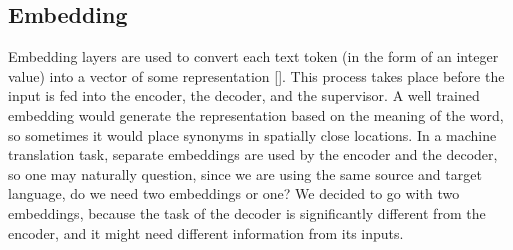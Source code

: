 \documentclass[letterpaper]{article} %
\begin{document}
\subsection{Embedding}
Embedding layers are used to convert each text token (in the form of an integer value) into a vector of some representation []. This process takes place before the input is fed into the encoder, the decoder, and the supervisor. A well trained embedding would generate the representation based on the meaning of the word, so sometimes it would place synonyms in spatially close locations. In a machine translation task, separate embeddings are used by the encoder and the decoder, so one may naturally question, since we are using the same source and target language, do we need two embeddings or one? We decided to go with two embeddings, because the task of the decoder is significantly different from the encoder, and it might need different information from its inputs.\cite{Stark04}



\end{document}
